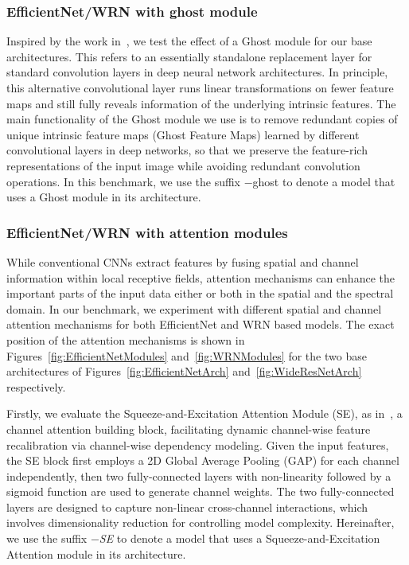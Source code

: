 \documentclass[journal]{IEEEtran}
\begin{document}
\subsubsection{EfficientNet/WRN with ghost module}


Inspired by the work in~\cite{Han_2020_CVPR}, we test the effect of a Ghost module for our base architectures. This refers to an essentially standalone replacement layer for standard convolution layers in deep neural network architectures. In principle, this alternative convolutional layer runs linear transformations on fewer feature maps and still fully reveals information of the underlying intrinsic features. The main functionality of the Ghost module we use is to remove redundant copies of unique intrinsic feature maps (Ghost Feature Maps) learned by different convolutional layers in deep networks, so that we preserve the feature-rich representations of the input image while avoiding redundant convolution operations. In this benchmark, we use the suffix $-$ghost to denote a model that uses a Ghost module in its architecture.








\subsubsection{EfficientNet/WRN with attention modules}
While conventional CNNs extract features by fusing spatial and channel information within local receptive fields, attention mechanisms can enhance the important parts of the input data either or both in the spatial and the spectral domain.
In our benchmark, we experiment with different spatial and channel attention mechanisms for both EfficientNet and WRN based models. The exact position of the attention mechanisms is shown in Figures~\ref{fig:EfficientNetModules} and~\ref{fig:WRNModules} for the two base architectures of Figures~\ref{fig:EfficientNetArch} and~\ref{fig:WideResNetArch} respectively.



Firstly, we evaluate the Squeeze-and-Excitation Attention Module (SE), as in~\cite{Hu_2018_CVPR}, a channel attention building block, facilitating dynamic channel-wise feature recalibration via channel-wise dependency modeling. Given the input features, the SE block first employs a 2D Global Average Pooling (GAP) for each channel independently, then two fully-connected layers with non-linearity followed by a sigmoid function are used to generate channel weights. The two fully-connected layers are designed to capture non-linear cross-channel interactions, which involves dimensionality reduction for controlling model complexity. Hereinafter, we use the suffix \textit{$-$SE} to denote a model that uses a Squeeze-and-Excitation Attention module in its architecture.
\end{document}
